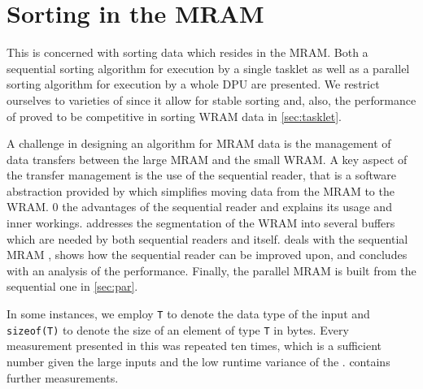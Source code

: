 \chapter[Sorting in the \texorpdfstring{\abb{MRAM}}{MRAM}]{Sorting in the \acs*{MRAM}}
\label{sec:mram}

This  is concerned with sorting data which resides in the \ac{MRAM}.
Both a sequential sorting algorithm for execution by a single tasklet as well as a parallel sorting algorithm for execution by a whole \ac{DPU} are presented.
We restrict ourselves to varieties of \MS{} since it allow for stable sorting and, also, the performance of \MS{} proved to be competitive in sorting \ac{WRAM} data in \cref{sec:tasklet}.

A challenge in designing an algorithm for \ac{MRAM} data is the management of data transfers between the large \ac{MRAM} and the small \ac{WRAM}.
A key aspect of the transfer management is the use of the sequential reader, that is a software abstraction provided by \upmem{} which simplifies moving data from the \ac{MRAM} to the \ac{WRAM}.
 0 the advantages of the sequential reader and explains its usage and inner workings.
 addresses the segmentation of the \ac{WRAM} into several buffers which are needed by both sequential readers and \MS{} itself.
 deals with the sequential \ac{MRAM} \MS{}, shows how the sequential reader can be improved upon, and concludes with an analysis of the performance.
Finally, the parallel \ac{MRAM} \MS{} is built from the sequential one in \cref{sec:par}.

In some instances, we employ \lstinline|T| to denote the data type of the input and \lstinline[keywords={}]|sizeof(T)| to denote the size of an element of type \lstinline|T| in bytes.
Every measurement presented in this  was repeated ten times, which is a sufficient number given the large inputs and the low runtime variance of the \MS*{}.
 contains further measurements.








